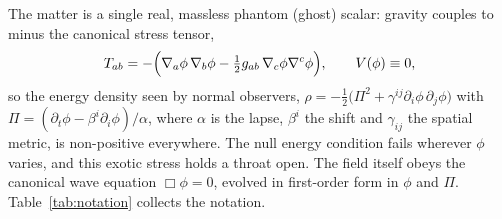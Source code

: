 \documentclass[twocolumn,floatfix,aps,prd,superscriptaddress,nofootinbib,showkeys]{revtex4-2}
\begin{document}
The matter is a single real, massless phantom (ghost) scalar: gravity couples to minus the canonical stress tensor,
\begin{equation}
T_{ab} = -\Bigl(\nabla_a\phi\,\nabla_b\phi - \tfrac12 g_{ab}\,\nabla_c\phi\nabla^c\phi\Bigr),
\qquad V(\phi)\equiv 0,
\label{eq:phantom}
\end{equation}
so the energy density seen by normal observers, $\rho=-\tfrac12\bigl(\Pi^2+\gamma^{ij}\partial_i\phi\,\partial_j\phi\bigr)$ with $\Pi=(\partial_t\phi-\beta^i\partial_i\phi)/\alpha$, where $\alpha$ is the lapse, $\beta^i$ the shift and $\gamma_{ij}$ the spatial metric, is non-positive everywhere. The null energy condition fails wherever $\phi$ varies, and this exotic stress holds a throat open. The field itself obeys the canonical wave equation $\Box\phi=0$, evolved in first-order form in $\phi$ and $\Pi$. Table~\ref{tab:notation} collects the notation.
\end{document}
